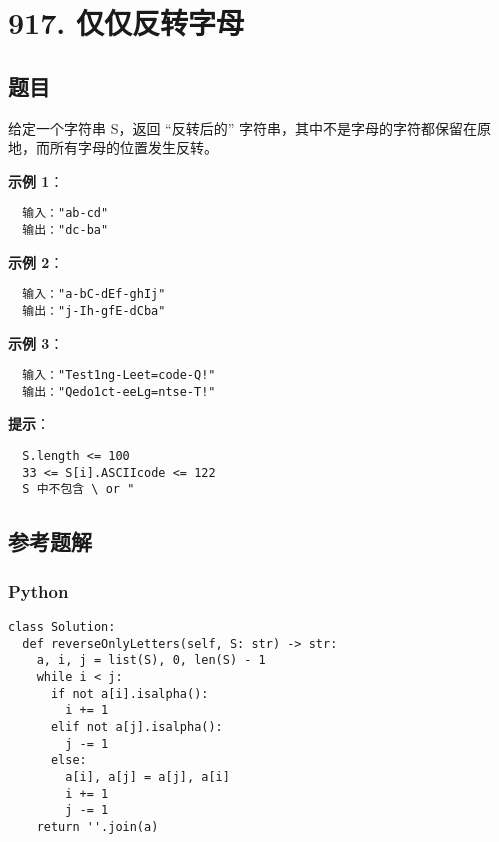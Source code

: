 \newpage
\section{917. 仅仅反转字母}
\label{leetcode:917}

\subsection{题目}

给定一个字符串 S，返回 ``反转后的'' 字符串，其中不是字母的字符都保留在原地，而所有字母的位置发生反转。

\textbf{示例 1}：

\begin{verbatim}
  输入："ab-cd"
  输出："dc-ba"
\end{verbatim}

\textbf{示例 2}：

\begin{verbatim}
  输入："a-bC-dEf-ghIj"
  输出："j-Ih-gfE-dCba"
\end{verbatim}

\textbf{示例 3}：

\begin{verbatim}
  输入："Test1ng-Leet=code-Q!"
  输出："Qedo1ct-eeLg=ntse-T!"
\end{verbatim}

\textbf{提示}：

\begin{verbatim}
  S.length <= 100
  33 <= S[i].ASCIIcode <= 122
  S 中不包含 \ or "
\end{verbatim}

\subsection{参考题解}

\subsubsection{Python}

\begin{verbatim}
class Solution:
  def reverseOnlyLetters(self, S: str) -> str:
    a, i, j = list(S), 0, len(S) - 1
    while i < j:
      if not a[i].isalpha():
        i += 1
      elif not a[j].isalpha():
        j -= 1
      else:
        a[i], a[j] = a[j], a[i]
        i += 1
        j -= 1
    return ''.join(a)
\end{verbatim}
